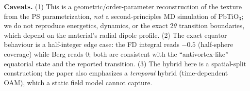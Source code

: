 \documentclass[11pt]{article}
\begin{document}
\textbf{Caveats.} (1) This is a geometric/order-parameter reconstruction of the
texture from the PS parametrization, \emph{not} a second-principles MD
simulation of PbTiO$_3$; we do not reproduce energetics, dynamics, or the exact
$2\theta$ transition boundaries, which depend on the material's radial dipole
profile. (2) The exact equator behaviour is a half-integer edge case: the FD
integral reads $-0.5$ (half-sphere coverage) while Berg reads $0$; both are
consistent with the ``antivortex-like'' equatorial state and the reported
transition. (3) The hybrid here is a spatial-split construction; the paper also
emphasizes a \emph{temporal} hybrid (time-dependent OAM), which a static field
model cannot capture.
\end{document}
